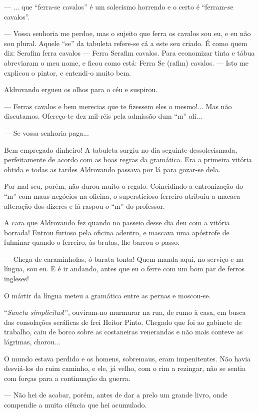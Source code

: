 --- ... que ``ferra-se cavalos'' é um solecismo horrendo e o certo é
``ferram-se cavalos''.

--- Vossa senhoria me perdoe, mas o sujeito que ferra os cavalos sou eu,
e eu não sou plural. Aquele ``se'' da tabuleta refere-se cá a este seu
criado. É como quem diz: Serafim ferra cavalos --- Ferra Serafim
cavalos. Para economizar tinta e tábua abreviaram o meu nome, e ficou
como está: Ferra Se (rafim) cavalos. --- Isto me explicou o pintor, e
entendi-o muito bem.

Aldrovando ergueu os olhos para o céu e suspirou.

--- Ferras cavalos e bem merecias que te fizessem eles o mesmo!... Mas
não discutamos. Ofereço-te dez mil-réis pela admissão dum ``m'' ali...

--- Se vossa senhoria paga...

Bem empregado dinheiro! A tabuleta surgiu no dia seguinte
dessolecismada, perfeitamente de acordo com as boas regras da gramática.
Era a primeira vitória obtida e todas as tardes Aldrovando passava por
lá para gozar-se dela.

Por mal seu, porém, não durou muito o regalo. Coincidindo a entronização
do ``m'' com maus negócios na oficina, o supersticioso ferreiro atribuiu
a macaca alteração dos dizeres e lá raspou o ``m'' do professor.

A cara que Aldrovando fez quando no passeio desse dia deu com a vitória
borrada! Entrou furioso pela oficina adentro, e mascava uma apóstrofe de
fulminar quando o ferreiro, às brutas, lhe barrou o passo.

--- Chega de caraminholas, ó barata tonta! Quem manda aqui, no serviço e
na língua, sou eu. E é ir andando, antes que eu o ferre com um bom par
de ferros ingleses!

O mártir da língua meteu a gramática entre as pernas e moscou-se.

``\emph{Sancta simplicitas}!'', ouviram-no murmurar na rua, de rumo à
casa, em busca das consolações seráficas de frei Heitor Pinto. Chegado
que foi ao gabinete de trabalho, caiu de borco sobre as costaneiras
venerandas e não mais conteve as lágrimas, chorou...

O mundo estava perdido e os homens, sobremaus, eram impenitentes. Não
havia desviá-los do ruim caminho, e ele, já velho, com o rim a rezingar,
não se sentia com forças para a continuação da guerra.

--- Não hei de acabar, porém, antes de dar a prelo um grande livro, onde
compendie a muita ciência que hei acumulado.

